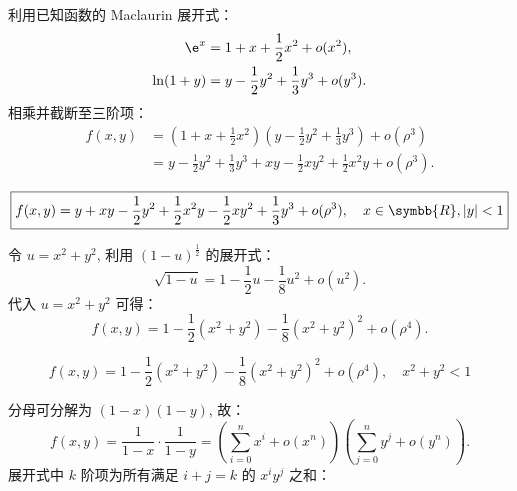 \begin{solution}

    利用已知函数的 Maclaurin 展开式：
    \begin{equation}
        \begin{aligned}
            \e^x     & = 1 + x + \frac{1}{2}x^2 + o(x^2),              \\
            \ln(1+y) & = y - \frac{1}{2}y^2 + \frac{1}{3}y^3 + o(y^3).
        \end{aligned}
    \end{equation}
    相乘并截断至三阶项：
    \begin{equation}
        \begin{aligned}
            f(x, y) & = \left( 1 + x + \frac{1}{2}x^2 \right) \left( y - \frac{1}{2}y^2 + \frac{1}{3}y^3 \right) + o(\rho^3) \\
                    & = y - \frac{1}{2}y^2 + \frac{1}{3}y^3 + xy - \frac{1}{2}xy^2 + \frac{1}{2}x^2y + o(\rho^3).
        \end{aligned}
    \end{equation}

    \begin{equation}
        \boxed{f(x, y) = y + xy - \frac{1}{2}y^2 + \frac{1}{2}x^2y - \frac{1}{2}xy^2 + \frac{1}{3}y^3 + o(\rho^3), \quad x \in \symbb{R}, |y| < 1}
    \end{equation}


    令 $u = x^2 + y^2$, 利用 $(1-u)^{\frac{1}{2}}$ 的展开式：
    \begin{equation}
        \sqrt{1-u} = 1 - \frac{1}{2}u - \frac{1}{8}u^2 + o(u^2).
    \end{equation}
    代入 $u = x^2 + y^2$ 可得：
    \begin{equation}
        f(x, y) = 1 - \frac{1}{2}(x^2+y^2) - \frac{1}{8}(x^2+y^2)^2 + o(\rho^4).
    \end{equation}

    \begin{equation}
        \boxed{f(x, y) = 1 - \frac{1}{2}(x^2+y^2) - \frac{1}{8}(x^2+y^2)^2 + o(\rho^4), \quad x^2 + y^2 < 1}
    \end{equation}


    分母可分解为 $(1-x)(1-y)$, 故：
    \begin{equation}
        f(x, y) = \frac{1}{1-x} \cdot \frac{1}{1-y} = \left( \sum_{i=0}^n x^i + o(x^n) \right) \left( \sum_{j=0}^n y^j + o(y^n) \right).
    \end{equation}
    展开式中 $k$ 阶项为所有满足 $i+j=k$ 的 $x^i y^j$ 之和：


\end{solution}
